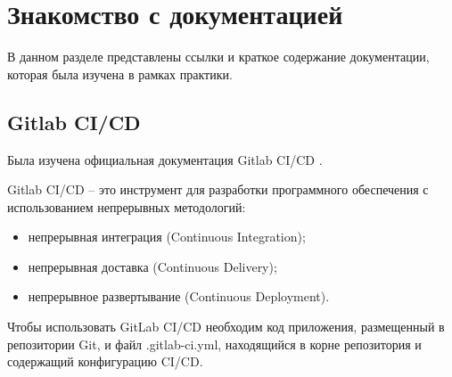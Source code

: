 \chapter{Знакомство с документацией}
В данном разделе представлены ссылки и краткое содержание документации, которая была изучена в рамках практики.
\section{Gitlab CI/CD}
Была изучена официальная документация Gitlab CI/CD \cite{bib1}.

Gitlab CI/CD -- это инструмент для разработки программного обеспечения с использованием непрерывных методологий:
\begin{itemize}
	\item непрерывная интеграция (Continuous Integration);
	\item непрерывная доставка (Continuous Delivery);
	\item непрерывное развертывание (Continuous Deployment).
\end{itemize}

Чтобы использовать GitLab CI/CD необходим код приложения, размещенный в репозитории Git, и файл .gitlab-ci.yml, находящийся в корне репозитория и содержащий конфигурацию CI/CD. 

